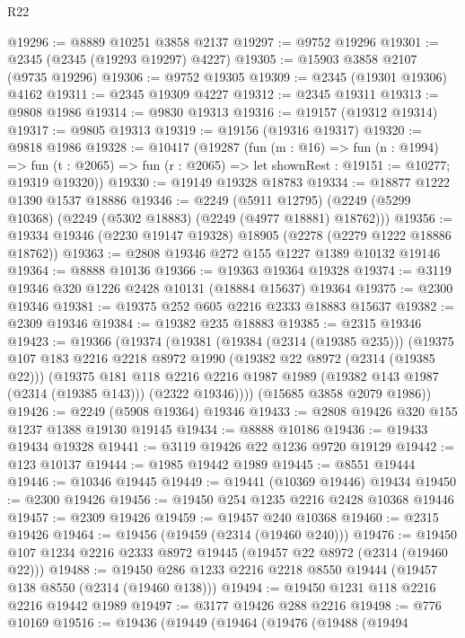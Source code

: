 \begin{lexlean}{R22}
\begin{coremodule}
@19296 := @8889 @10251 @3858 @2137
@19297 := @9752 @19296
@19301 := @2345 (@2345 (@19293 @19297) @4227)
@19305 := @15903 @3858 @2107 (@9735 @19296)
@19306 := @9752 @19305
@19309 := @2345 (@19301 @19306) @4162
@19311 := @2345 @19309 @4227
@19312 := @2345 @19311
@19313 := @9808 @1986
@19314 := @9830 @19313
@19316 := @19157 (@19312 @19314)
@19317 := @9805 @19313
@19319 := @19156 (@19316 @19317)
@19320 := @9818 @1986
@19328 := @10417
    (@19287
      (fun (m : @16) =>
      fun (n : @1994) =>
      fun (t : @2065) => fun (r : @2065) => let shownRest : @19151 := @10277; @19319 @19320))
@19330 := @19149 @19328 @18783
@19334 := @18877 @1222 @1390 @1537 @18886
@19346 := @2249
    (@5911 @12795)
    (@2249 (@5299 @10368) (@2249 (@5302 @18883) (@2249 (@4977 @18881) @18762)))
@19356 := @19334 @19346 (@2230 @19147 @19328) @18905 (@2278 (@2279 @1222 @18886 @18762))
@19363 := @2808 @19346 @272 @155 @1227 @1389 @10132 @19146
@19364 := @8888 @10136
@19366 := @19363 @19364 @19328
@19374 := @3119 @19346 @320 @1226 @2428 @10131 (@18884 @15637) @19364
@19375 := @2300 @19346
@19381 := @19375 @252 @605 @2216 @2333 @18883 @15637
@19382 := @2309 @19346
@19384 := @19382 @235 @18883
@19385 := @2315 @19346
@19423 := @19366
    (@19374
      (@19381
        (@19384 (@2314 (@19385 @235)))
        (@19375
          @107
          @183
          @2216
          @2218
          @8972
          @1990
          (@19382 @22 @8972 (@2314 (@19385 @22)))
          (@19375
            @181
            @118
            @2216
            @2216
            @1987
            @1989
            (@19382 @143 @1987 (@2314 (@19385 @143)))
            (@2322 @19346))))
      (@15685 @3858 @2079 @1986))
@19426 := @2249 (@5908 @19364) @19346
@19433 := @2808 @19426 @320 @155 @1237 @1388 @19130 @19145
@19434 := @8888 @10186
@19436 := @19433 @19434 @19328
@19441 := @3119 @19426 @22 @1236 @9720 @19129
@19442 := @123 @10137
@19444 := @1985 @19442 @1989
@19445 := @8551 @19444
@19446 := @10346 @19445
@19449 := @19441 (@10369 @19446) @19434
@19450 := @2300 @19426
@19456 := @19450 @254 @1235 @2216 @2428 @10368 @19446
@19457 := @2309 @19426
@19459 := @19457 @240 @10368
@19460 := @2315 @19426
@19464 := @19456 (@19459 (@2314 (@19460 @240)))
@19476 := @19450 @107 @1234 @2216 @2333 @8972 @19445 (@19457 @22 @8972 (@2314 (@19460 @22)))
@19488 := @19450 @286 @1233 @2216 @2218 @8550 @19444 (@19457 @138 @8550 (@2314 (@19460 @138)))
@19494 := @19450 @1231 @118 @2216 @2216 @19442 @1989
@19497 := @3177 @19426 @288 @2216
@19498 := @776 @10169
@19516 := @19436
    (@19449
      (@19464
        (@19476
          (@19488
            (@19494

\end{coremodule}
\end{lexlean}
